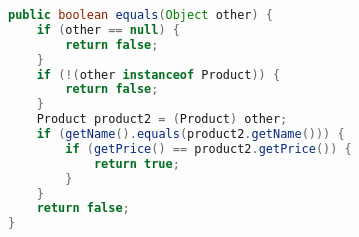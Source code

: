 \begin{lstlisting}[language=Java]
public boolean equals(Object other) {
    if (other == null) {
        return false;
    }
    if (!(other instanceof Product)) {
        return false;
    }
    Product product2 = (Product) other;
    if (getName().equals(product2.getName())) {
        if (getPrice() == product2.getPrice()) {
            return true;
        }
    }
    return false;
}
\end{lstlisting}
